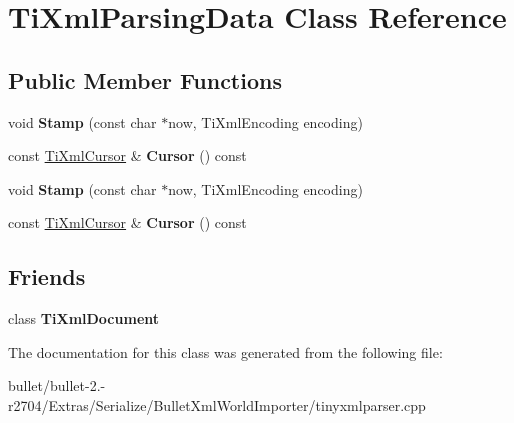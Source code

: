 \hypertarget{class_ti_xml_parsing_data}{\section{Ti\+Xml\+Parsing\+Data Class Reference}
\label{class_ti_xml_parsing_data}
}
\subsection*{Public Member Functions}
\begin{DoxyCompactItemize}
\item 
\hypertarget{class_ti_xml_parsing_data_a65cee8ab77a36c605db08c84b4c30a7d}{void {\bfseries Stamp} (const char $\ast$now, Ti\+Xml\+Encoding encoding)}\label{class_ti_xml_parsing_data_a65cee8ab77a36c605db08c84b4c30a7d}

\item 
\hypertarget{class_ti_xml_parsing_data_a9e63d965fdb53ff4ac711e105269e918}{const \hyperlink{struct_ti_xml_cursor}{Ti\+Xml\+Cursor} \& {\bfseries Cursor} () const }\label{class_ti_xml_parsing_data_a9e63d965fdb53ff4ac711e105269e918}

\item 
\hypertarget{class_ti_xml_parsing_data_a65cee8ab77a36c605db08c84b4c30a7d}{void {\bfseries Stamp} (const char $\ast$now, Ti\+Xml\+Encoding encoding)}\label{class_ti_xml_parsing_data_a65cee8ab77a36c605db08c84b4c30a7d}

\item 
\hypertarget{class_ti_xml_parsing_data_a9e63d965fdb53ff4ac711e105269e918}{const \hyperlink{struct_ti_xml_cursor}{Ti\+Xml\+Cursor} \& {\bfseries Cursor} () const }\label{class_ti_xml_parsing_data_a9e63d965fdb53ff4ac711e105269e918}

\end{DoxyCompactItemize}
\subsection*{Friends}
\begin{DoxyCompactItemize}
\item 
\hypertarget{class_ti_xml_parsing_data_ad0236f45dcd5786504391b84e64745cb}{class {\bfseries Ti\+Xml\+Document}}\label{class_ti_xml_parsing_data_ad0236f45dcd5786504391b84e64745cb}

\end{DoxyCompactItemize}


The documentation for this class was generated from the following file\+:\begin{DoxyCompactItemize}
\item 
bullet/bullet-\/2.-\/r2704/\+Extras/\+Serialize/\+Bullet\+Xml\+World\+Importer/tinyxmlparser.\+cpp\end{DoxyCompactItemize}
